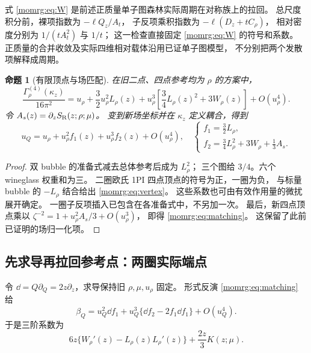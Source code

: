 \documentclass[11pt,a4paper,oneside]{ctexart}
\theoremstyle{cnplain}
\newtheorem{proposition}[theorem]{命题}
\theoremstyle{definition}
\theoremstyle{remark}
\numberwithin{equation}{section}
\begin{document}
式 \eqref{momrg:eq:W} 是前述正质量单子图森林实际周期在对称族上的拉回。
总尺度积分前，裸项指数为 $-\ell Q_z/A_t$，
子反项乘积指数为 $-\ell(D_z+tC_\rho)$，
相对密度分别为 $1/(tA_t^2)$ 与 $1/t$；
这一检查直接固定 \eqref{momrg:eq:W} 的符号和系数。
正质量的合并收敛及实际四维相对载体沿用已证单子图模型，
不分别把两个发散项解释成周期。

\begin{proposition}[有限顶点与场匹配]\label{momrg:prop:vertex}
在旧二点、四点参考均为 $\rho$ 的方案中，
\begin{equation}\label{momrg:eq:vertex}
 \frac{\Gamma_\rho^{(4)}(\kappa_z)}{16\pi^2}
 =u_\rho+\frac32u_\rho^2L_\rho(z)
    +u_\rho^3\left[\frac34L_\rho(z)^2+3W_\rho(z)\right]
    +O(u_\rho^4).
\end{equation}
令 $A_s(z)=\partial_zS_{\mathrm R}(z;\rho;\mu)$。
变到新场坐标并在 $\kappa_z$ 定义耦合，得到
\begin{equation}\label{momrg:eq:matching}
 u_Q=u_\rho+u_\rho^2 f_1(z)+u_\rho^3 f_2(z)+O(u_\rho^4),
 \quad
 \begin{cases}
 f_1=\frac32L_\rho,\\
 f_2=\frac34L_\rho^2+3W_\rho+\frac13A_s.
 \end{cases}
\end{equation}
\end{proposition}
\begin{proof}
双 bubble 的准备式减去总体参考后成为 $L_\rho^2$；
三个图给 $3/4$。六个 wineglass 权重和为三。
二圈欧氏 1PI 四点顶点的符号为正，一圈为负，
与标量 bubble 的 $-L_\rho$ 结合给出 \eqref{momrg:eq:vertex}。
这些系数也可由有效作用量的微扰展开确定。
一圈子反项插入已包含在各准备式中，不另加一次。
最后，新四点顶点乘以
$\zeta^{-2}=1+u_\rho^2 A_s/3+O(u_\rho^3)$，
即得 \eqref{momrg:eq:matching}。
这保留了此前已证明的场归一化项。
\end{proof}


\subsection{先求导再拉回参考点：两圈实际端点}\label{momrg:sec:beta}
令 $\dd=Q\partial_Q=2z\partial_z$，求导保持旧 $\rho,\mu,u_\rho$ 固定。
形式反演 \eqref{momrg:eq:matching} 给
\begin{equation}\label{momrg:eq:beta-old}
 \beta_Q=u_Q^2\dd f_1+
 u_Q^3\{\dd f_2-2f_1\dd f_1\}+O(u_Q^4).
\end{equation}
于是三阶系数为
\begin{equation}\label{momrg:eq:beta-combination}
 6z\{W_\rho'(z)-L_\rho(z)L_\rho'(z)\}
                   +\frac{2z}{3}K(z;\mu).
\end{equation}
\end{document}
